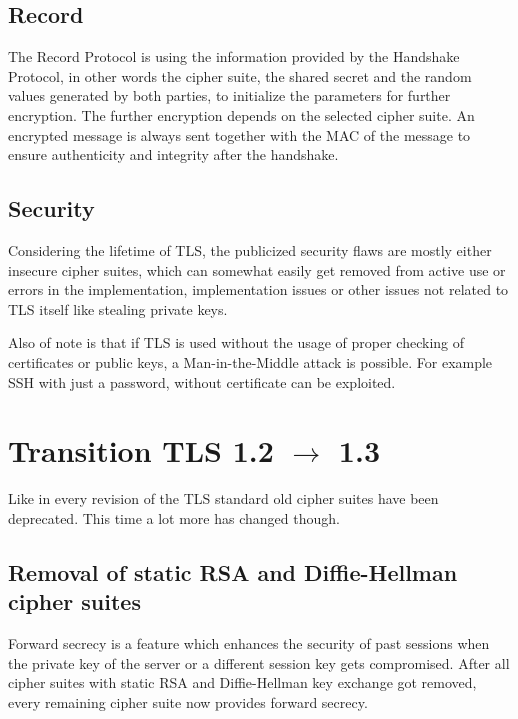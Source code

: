 \documentclass[a4paper,conference]{IEEEtran}
\begin{document}
\subsection{Record}
The Record Protocol is using the information provided by the Handshake Protocol, in other words the cipher suite, the shared secret and the random values generated by both parties, to initialize the parameters for further encryption. The further encryption depends on the selected cipher suite. An encrypted message is always sent together with the MAC of the message to ensure authenticity and integrity after the handshake.\cite{rfc5246}

\subsection{Security}
Considering the lifetime of TLS, the publicized security flaws are mostly either insecure cipher suites, which can somewhat easily get removed from active use or errors in the implementation, implementation issues or other issues not related to TLS itself like stealing private keys.\cite{rfc7457}

Also of note is that if TLS is used without the usage of proper checking of certificates or public keys, a Man-in-the-Middle attack is possible. For example SSH with just a password, without certificate can be exploited.


\section{Transition TLS 1.2 $\rightarrow$ 1.3}

Like in every revision of the TLS standard old cipher suites have been deprecated. This time a lot more has changed though\cite{rfc8446}.

\subsection{Removal of static RSA and Diffie-Hellman cipher suites}
Forward secrecy is a feature which enhances the security of past sessions when the private key of the server or a different session key gets compromised. After all cipher suites with static RSA and Diffie-Hellman key exchange got removed, every remaining cipher suite now provides forward secrecy.
\end{document}
